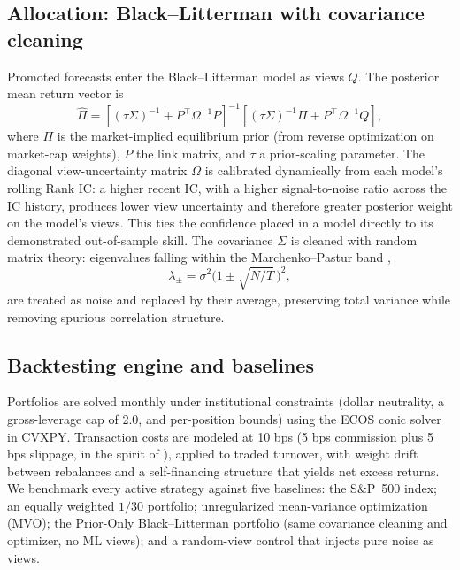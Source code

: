 \documentclass[11pt]{article}
\begin{document}
\subsection{Allocation: Black--Litterman with covariance cleaning}
Promoted forecasts enter the Black--Litterman model \citep{black1992global,he1999intuition} as
views $Q$. The posterior mean return vector is
\begin{equation}
\hat{\Pi} = \left[(\tau \Sigma)^{-1} + P^{\top} \Omega^{-1} P\right]^{-1}
            \left[(\tau \Sigma)^{-1} \Pi + P^{\top} \Omega^{-1} Q\right],
\end{equation}
where $\Pi$ is the market-implied equilibrium prior (from reverse optimization on market-cap
weights), $P$ the link matrix, and $\tau$ a prior-scaling parameter. The diagonal view-uncertainty
matrix $\Omega$ is calibrated dynamically from each model's rolling Rank IC: a higher recent IC,
with a higher signal-to-noise ratio across the IC history, produces lower view uncertainty and
therefore greater posterior weight on the model's views. This ties the confidence placed in a
model directly to its demonstrated out-of-sample skill. The covariance $\Sigma$ is cleaned with
random matrix theory: eigenvalues falling within the Marchenko--Pastur band
\citep{marchenko1967distribution,laloux1999noise},
\begin{equation}
\lambda_\pm = \sigma^2\Big(1 \pm \sqrt{N/T}\,\Big)^2,
\end{equation}
are treated as noise and replaced by their average, preserving total variance while removing
spurious correlation structure.

\subsection{Backtesting engine and baselines}
Portfolios are solved monthly under institutional constraints (dollar neutrality, a gross-leverage
cap of 2.0, and per-position bounds) using the ECOS conic solver \citep{domahidi2013ecos} in
CVXPY. Transaction costs are modeled at 10 bps (5 bps commission plus 5 bps slippage, in the
spirit of \citet{almgren2001optimal}), applied to traded turnover, with weight drift between
rebalances and a self-financing structure that yields net excess returns. We benchmark every
active strategy against five baselines: the S\&P~500 index; an equally weighted $1/30$ portfolio;
unregularized mean-variance optimization (MVO); the Prior-Only Black--Litterman portfolio (same
covariance cleaning and optimizer, no ML views); and a random-view control that injects pure noise
as views.
\end{document}
